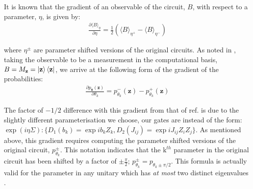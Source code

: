 It is known  that the gradient of an observable of the circuit, $B$, with respect to a parameter, $\eta$, is given by:
\begin{align}
\frac{\partial \langle B \rangle_\eta}{\partial \eta} = \frac{1}{2}\left(\langle B \rangle_{\eta^+} - \langle B \rangle_{\eta^-}\right) \label{liucircuitgradient}
\end{align} 


where $\eta^{\pm}$ are parameter shifted versions of the original circuits. As noted in , taking the observable to be a measurement in the computational basis, $B= M_{\mathbf{z}} =  \ket{\mathbf{z}}\bra{\mathbf{z}}$, we arrive at the following form of the gradient of the probabilities:
\begin{align}
\frac{\partial p_{\boldsymbol\theta}(\mathbf{z})}{\partial \theta_k} = p_{\theta_k}^{-}(\mathbf{z}) - p_{\theta_k}^{+}(\mathbf{z}) \label{mmdprobabilitygradient}
\end{align}

The factor of $-1/2$ difference with this gradient from that of ref.  is due to the slightly different parameterisation we choose, our gates are instead of the form: $\exp(i\eta\Sigma): \{D_1(b_k) =  \exp{ib_k Z_k}, D_2(J_{ij}) = \exp{iJ_{ij}Z_iZ_j}\}$.
As mentioned above, this gradient requires computing the parameter shifted versions of the original circuit, $p_{\theta_k}^{\pm}$. This notation indicates that the $\text{k}^{th}$ parameter in the original circuit has been shifted by a factor of $\pm \frac{\pi}{2}$; $p_{\theta_k}^{\pm} = p_{\theta_k \pm \pi/2}$. This formula is actually valid for the parameter in any unitary which has \textit{at most} two distinct eigenvalues .

